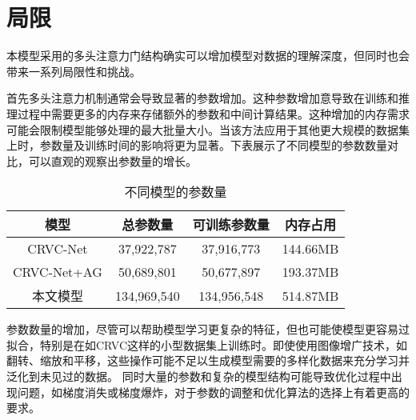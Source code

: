\section{局限}
本模型采用的多头注意力门结构确实可以增加模型对数据的理解深度，但同时也会带来一系列局限性和挑战。

首先多头注意力机制通常会导致显著的参数增加。这种参数增加意导致在训练和推理过程中需要更多的内存来存储额外的参数和中间计算结果。这种增加的内存需求可能会限制模型能够处理的最大批量大小。当该方法应用于其他更大规模的数据集上时，参数量及训练时间的影响将更为显著。下表展示了不同模型的参数数量对比，可以直观的观察出参数量的增长。
\begin{table}[h]
    \centering
    \caption{不同模型的参数量}
    \label{tab:parma}
    \begin{tabularx}{\textwidth}{CCCC}
      \toprule
      模型 & 总参数量 & 可训练参数量 & 内存占用  \\
      \midrule
    CRVC-Net& 37,922,787  & 37,916,773 & 144.66MB \\
    CRVC-Net+AG& 50,689,801  & 50,677,897 & 193.37MB \\
    本文模型  & 134,969,540    & 134,956,548 & 514.87MB \\   
      \bottomrule
    \end{tabularx}
\end{table}


参数数量的增加，尽管可以帮助模型学习更复杂的特征，但也可能使模型更容易过拟合，特别是在如CRVC这样的小型数据集上训练时。即使使用图像增广技术，如翻转、缩放和平移，这些操作可能不足以生成模型需要的多样化数据来充分学习并泛化到未见过的数据。
同时大量的参数和复杂的模型结构可能导致优化过程中出现问题，如梯度消失或梯度爆炸，对于参数的调整和优化算法的选择上有着更高的要求。





